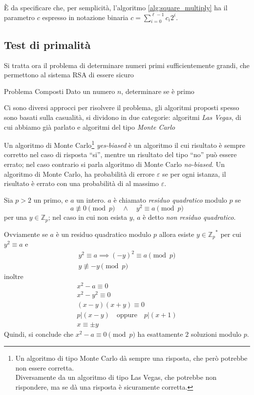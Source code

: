 

È da specificare che, per semplicità, l'algoritmo \ref{alg:square_multiply} ha il parametro $c$ espresso in notazione binaria $c = \sum_{i=0}^{\ell - 1}c_i 2^i $.

\subsection{Test di primalità}
Si tratta ora il problema di determinare numeri primi sufficientemente grandi, che permettono al sistema RSA di essere sicuro

\begin{definition}{Problema Composti}
    Dato un numero $n$, determinare se è primo
\end{definition}

Ci sono diversi approcci per risolvere il problema, gli algoritmi proposti spesso sono basati sulla casualità, si dividono in due categorie: algoritmi \emph{Las Vegas}, di cui abbiamo già parlato e algoritmi del tipo \emph{Monte Carlo}

\begin{definition}
    Un algoritmo di Monte Carlo\footnote{Un algoritmo di tipo Monte Carlo dà sempre una risposta, che però potrebbe non essere corretta. \\ Diversamente da un algoritmo di tipo Las Vegas, che potrebbe non rispondere, ma se dà una risposta è sicuramente corretta.} \emph{yes-biased} è un algoritmo il cui risultato è sempre corretto nel caso di risposta ``si'', mentre un risultato del tipo ``no'' può essere errato; nel caso contrario si parla algoritmo di Monte Carlo \emph{no-biased}. Un algoritmo di Monte Carlo, ha probabilità di errore $\varepsilon$ se per ogni istanza, il risultato è errato con una probabilità di al massimo $\varepsilon$.   
\end{definition}

\begin{definition}
    Sia $p>2$ un primo, e $a$ un intero. $a$ è chiamato \emph{residuo quadratico} modulo $p$ se 
    \[
        a \not\equiv 0 \pmod p \quad \land \quad  y^2 \equiv a \pmod p 
    \]
    per una $y \in \mathbb{Z}_p$; nel caso in cui non esista $y$, $a$ è detto \textit{non residuo quadratico}.
\end{definition}
Ovviamente se $a$ è un residuo quadratico modulo $p$ allora esiste $y \in {\mathbb{Z}_p}^*$ per cui $y^2 \equiv a$ e
\begin{align*}
    y^2 \equiv a \implies (-y)^2 \equiv a \pmod p\\
    y \not\equiv -y \pmod p
\end{align*}
inoltre
\begin{gather*}
    x^2 - a \equiv 0 \\
    x^2 - y^2 \equiv 0 \\
    (x-y)(x+y) \equiv 0 \\
    p|(x-y) \quad \text{oppure} \quad p |(x+1)\\
    x \equiv \pm y 
\end{gather*}
\noindent Quindi, si conclude che $x^2 -a \equiv 0 \pmod p$ ha esattamente $2$ soluzioni modulo $p$. 

